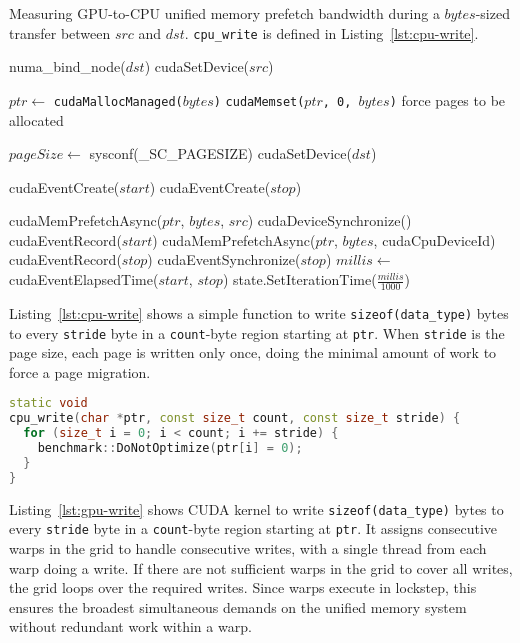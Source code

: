 \begin{algorithm}[H]
	\caption[Measuring GPU-to-CPU Unified Memory Prefetch Bandwidth.]{
		Measuring GPU-to-CPU unified memory prefetch bandwidth during a $bytes$-sized transfer between $src$ and $dst$.
		\texttt{cpu\_write} is defined in Listing~\ref{lst:cpu-write}.
	}
	\label{alg:um-prefetch-bw-gpu-cpu}
	\begin{algorithmic}[1]
		\Statex
		
		\State numa\_bind\_node($dst$)
		\State cudaSetDevice($src$)

		\State $ptr \gets$ \texttt{cudaMallocManaged($bytes$)}
		\State \texttt{cudaMemset($ptr$, 0, $bytes$)} \Comment force pages to be allocated

		\State $pageSize \gets$ sysconf(\_SC\_PAGESIZE)
		\State cudaSetDevice($dst$)

		\State cudaEventCreate($start$)
		\State cudaEventCreate($stop$)		        
				
			\State cudaMemPrefetchAsync($ptr$, $bytes$, $src$)
			\State cudaDeviceSynchronize()
			\State cudaEventRecord($start$)
			\State cudaMemPrefetchAsync($ptr$, $bytes$, cudaCpuDeviceId)
			\State cudaEventRecord($stop$)
			\State cudaEventSynchronize($stop$)
			\State $millis \gets$ cudaEventElapsedTime($start$, $stop$)
			\State state.SetIterationTime($\frac{millis}{1000}$)
		\EndFor
		\EndFunction			
	\end{algorithmic}
\end{algorithm}


Listing~\ref{lst:cpu-write} shows a simple function to write \texttt{sizeof(data\_type)} bytes to every \texttt{stride} byte in a \texttt{count}-byte region starting at \texttt{ptr}.
When \texttt{stride} is the page size, each page is written only once, doing the minimal amount of work to force a page migration.

\begin{lstlisting}[language=c++, caption=\texttt{cpu\_write} function., label=lst:cpu-write]
static void 
cpu_write(char *ptr, const size_t count, const size_t stride) {
  for (size_t i = 0; i < count; i += stride) {
    benchmark::DoNotOptimize(ptr[i] = 0);
  }
}
\end{lstlisting}

Listing~\ref{lst:gpu-write} shows CUDA kernel to write \texttt{sizeof(data\_type)} bytes to every \texttt{stride} byte in a \texttt{count}-byte region starting at \texttt{ptr}.
It assigns consecutive warps in the grid to handle consecutive writes, with a single thread from each warp doing a write.
If there are not sufficient warps in the grid to cover all writes, the grid loops over the required writes.
Since warps execute in lockstep, this ensures the broadest simultaneous demands on the unified memory system without redundant work within a warp.

